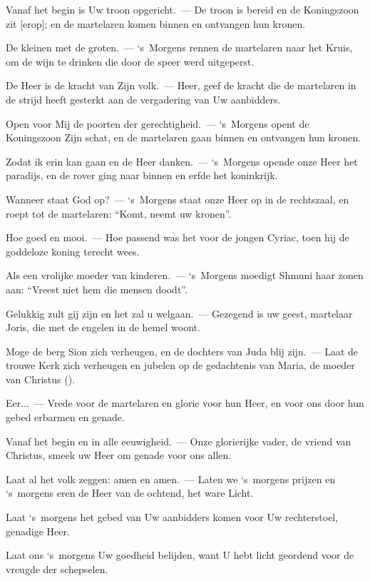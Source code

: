 \documentclass[12pt,twoside,a5paper]{article}
\begin{document}
\begin{halfparskip}
  Vanaf het begin is Uw troon opgericht.~--- De troon is bereid en de Koningszoon zit [erop]; en de martelaren komen binnen en ontvangen hun kronen.

  De kleinen met de groten.~--- `s~Morgens rennen de martelaren naar het Kruis, om de wijn te drinken die door de speer werd uitgeperst.

  De Heer is de kracht van Zijn volk.~--- Heer, geef de kracht die de martelaren in de strijd heeft gesterkt aan de vergadering van Uw aanbidders.

  Open voor Mij de poorten der gerechtigheid.~--- `s~Morgens opent de Koningszoon Zijn schat, en de martelaren gaan binnen en ontvangen hun kronen.

  Zodat ik erin kan gaan en de Heer danken.~--- `s~Morgens opende onze Heer het paradijs, en de rover ging naar binnen en erfde het koninkrijk.

  Wanneer staat God op?~--- `s~Morgens staat onze Heer op in de rechtszaal, en roept tot de martelaren: ``Komt, neemt uw kronen''.

  Hoe goed en mooi.~--- Hoe passend was het voor de jongen Cyriac, toen hij de goddeloze koning terecht wees.

  Als een vrolijke moeder van kinderen.~--- `s~Morgens moedigt Shmuni haar zonen aan: ``Vreest niet hem die mensen doodt''.

  Gelukkig zult gij zijn en het zal u welgaan.~--- Gezegend is uw geest, martelaar Joris, die met de engelen in de hemel woont.

  Moge de berg Sion zich verheugen, en de dochters van Juda blij zijn.~--- Laat de trouwe Kerk zich verheugen en jubelen op de gedachtenis van Maria, de moeder van Christus ().

  Eer...~--- Vrede voor de martelaren en glorie voor hun Heer, en voor ons door hun gebed erbarmen en genade.

  Vanaf het begin en in alle eeuwigheid.~--- Onze glorierijke vader, de vriend van Christus, smeek uw Heer om genade voor ons allen.

  Laat al het volk zeggen: amen en amen.~--- Laten we `s~morgens prijzen en `s~morgens eren de Heer van de ochtend, het ware Licht.

  Laat `s~morgens het gebed van Uw aanbidders komen voor Uw rechterstoel, genadige Heer.

  Laat ons `s~morgens Uw goedheid belijden, want U hebt licht geordend voor de vreugde der schepselen.
\end{halfparskip}
\end{document}
